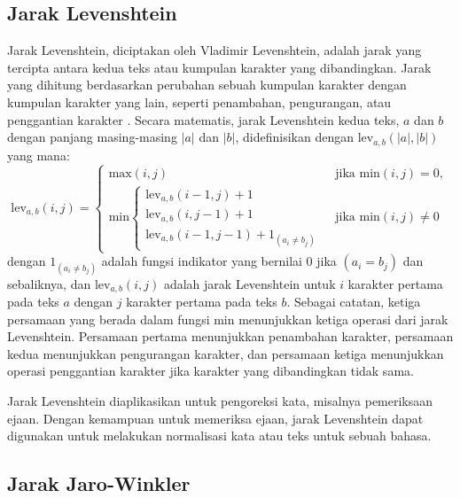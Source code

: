 \subsection{Jarak Levenshtein}

Jarak Levenshtein, diciptakan oleh Vladimir Levenshtein, adalah jarak yang tercipta antara kedua teks atau kumpulan karakter yang dibandingkan. Jarak yang dihitung berdasarkan perubahan sebuah kumpulan karakter dengan kumpulan karakter yang lain, seperti penambahan, pengurangan, atau penggantian karakter \parencite{levenshtein1966binary}. Secara matematis, jarak Levenshtein kedua teks, $a$ dan $b$ dengan panjang masing-masing $|a|$ dan $|b|$, didefinisikan dengan $\text{lev}_{a,b}(|a|,|b|)$ yang mana:
\begin{equation} \label{eq:lv}
	\text{lev}_{a,b}(i,j)=\begin{cases}
		\text{max}(i,j) & \text{ jika min} (i,j)=0, \\ 
		\text{min}\begin{cases}
			\text{lev}_{a,b}(i-1,j)+1\\ 
			\text{lev}_{a,b}(i,j-1)+1\\ 
			\text{lev}_{a,b}(i-1,j-1)+1_{(a_{i}\neq b_{j})}
		\end{cases} & \text{ jika min} (i,j)\neq 0
	\end{cases}
\end{equation}
\noindent
dengan $1_{(a_{i}\neq b_{j})}$ adalah fungsi indikator yang bernilai 0 jika $(a_{i} = b_{j})$ dan sebaliknya, dan $\text{lev}_{a,b}(i,j)$ adalah jarak Levenshtein untuk $i$ karakter pertama pada teks $a$ dengan $j$ karakter pertama pada teks $b$. Sebagai catatan, ketiga persamaan yang berada dalam fungsi min menunjukkan ketiga operasi dari jarak Levenshtein. Persamaan pertama menunjukkan penambahan karakter, persamaan kedua menunjukkan pengurangan karakter, dan persamaan ketiga menunjukkan operasi penggantian karakter jika karakter yang dibandingkan tidak sama.

Jarak Levenshtein diaplikasikan untuk pengoreksi kata, misalnya pemeriksaan ejaan. Dengan kemampuan untuk memeriksa ejaan, jarak Levenshtein dapat digunakan untuk melakukan normalisasi kata atau teks untuk sebuah bahasa.

\subsection{Jarak Jaro-Winkler}

